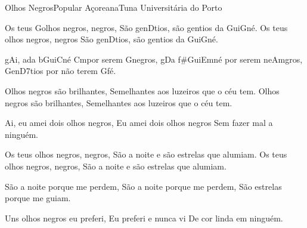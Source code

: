 \begin{musica}{Olhos Negros}{Popular Açoreana}{Tuna Universitária do Porto}

Os teus \ac{G}{o}lhos negros, negros,
São gen\ac{D}{ti}os, são gentios da Gui\ac{G}{né}.
Os teus olhos negros, negros
São gen\ac{D}{ti}os, são gentios da Gui\ac{G}{né}.

\ac{g}{Ai}, \ac{a}{da} \ac{b}{Gu}i\ac{C}{né} \ac{Cm}{por} serem \ac{G}{ne}gros,
\ac{g}{Da} \ac{f#}{Gu}i\ac{Em}{né} por serem ne\ac{Am}{gros},
Gen\ac{D7}{tios} por não terem \ac{G}{fé}.

Olhos negros são brilhantes,
Semelhantes aos luzeiros que o céu tem.
Olhos negros são brilhantes,
Semelhantes aos luzeiros que o céu tem.

Ai, eu amei dois olhos negros,
Eu amei dois olhos negros
Sem fazer mal a ninguém.

Os teus olhos negros, negros,
São a noite e são estrelas que alumiam.
Os teus olhos negros, negros,
São a noite e são estrelas que alumiam.

São a noite porque me perdem,
São a noite porque me perdem,
São estrelas porque me guiam.

Uns olhos negros eu preferi,
Eu preferi e nunca vi
De cor linda em ninguém.

\end{musica}

